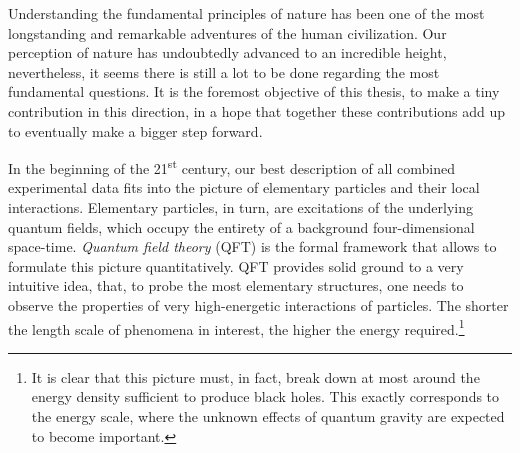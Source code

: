 Understanding the fundamental principles of nature has been one of the most
longstanding and remarkable adventures of the human civilization.
Our perception of nature has undoubtedly advanced to an incredible height,
nevertheless, it seems there is still a lot to be done regarding the most fundamental questions.
It is the foremost objective of this thesis, to
make a tiny contribution in this direction, in a hope that together these contributions add up to eventually make a bigger step forward.

In the beginning of the 21\textsuperscript{st} century, our best description of all combined experimental data fits into the picture of elementary particles and their local interactions.
Elementary particles, in turn, are excitations of the underlying quantum fields, which occupy the entirety of a background four-dimensional space-time.
\emph{Quantum field theory} (QFT) is the formal framework that allows to formulate this picture quantitatively.
QFT provides solid ground to a very intuitive idea,
that, to probe the most elementary structures, one needs to observe the properties of very high-energetic interactions of particles.
The shorter the length scale of phenomena in interest, the higher the energy required.\footnote{
  It is clear that this picture must, in fact, break down at most around the energy density sufficient to produce black holes.
  This exactly corresponds to the energy scale, where the unknown effects of quantum gravity are expected to become important.
}

